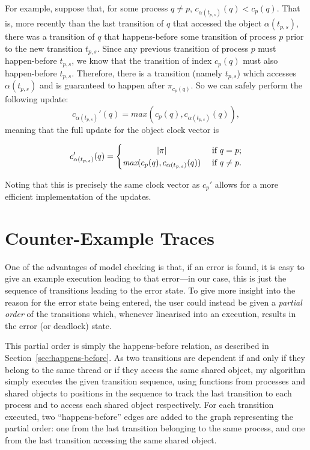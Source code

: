 \documentclass[12pt,a4paper,twoside,openright]{report}
\begin{document}
For example, suppose that,
for some process $q \neq p$,
$c_{\alpha(t_{p,s})}(q) < c_p(q)$. That is,
more recently than the last transition of
$q$ that accessed the object $\alpha(t_{p,s})$,
there was a transition of $q$ that happens-before
some transition of process $p$ prior to the new
transition $t_{p,s}$. Since any previous
transition of process $p$ must happen-before
$t_{p,s}$, we know that the transition
of index $c_p(q)$ must also happen-before
$t_{p,s}$. Therefore, there is a transition
(namely $t_{p,s}$) which
accesses $\alpha(t_{p,s})$ and is guaranteed
to happen after $\pi_{c_p(q)}$. So we can
safely perform the following update:
\[ c_{\alpha(t_{p,s})}'(q) =\textit{max}(c_p(q),
c_{\alpha(t_{p,s})}(q)),
\]
meaning that the full update for the object
clock vector is

\[ c_{\alpha(t_{p,s})}'(q) =
\begin{cases}
\hfill |\pi| \hfill & \text{ if } q = p; \\
\hfill \textit{max}(c_p(q),
c_{\alpha(t_{p,s})}(q))
\hfill & \text{ if } q \neq p.
\end{cases}\]

Noting that this is precisely the same
clock vector as $c_p'$ allows for a
more efficient implementation of
the updates.

\section{Counter-Example Traces} \label{sec:traces}
One of the advantages of model checking
is that, if
an error is found, it is easy to
give an example execution leading
to that error---in
our case, this is just the sequence of
transitions leading to the error state.
To give more insight into the reason for the
error state being entered, the user could
instead be given a
\emph{partial order} of the transitions which,
whenever linearised into an execution,
results in the error (or deadlock) state.

This partial order is simply the happens-before
relation, as described in
Section~\ref{sec:happens-before}. As
two transitions are dependent if and only
if they belong to the same thread or if
they access the same shared object, my
algorithm simply executes the given transition
sequence, using functions from processes
and shared objects to positions in
the sequence to track the last
transition to each process and
to access each shared object respectively.
For each
transition executed, two ``happens-before''
edges are added
to the graph representing the partial
order: one from the last transition
belonging to the same process, and one
from the last transition accessing the
same shared object.
\end{document}
